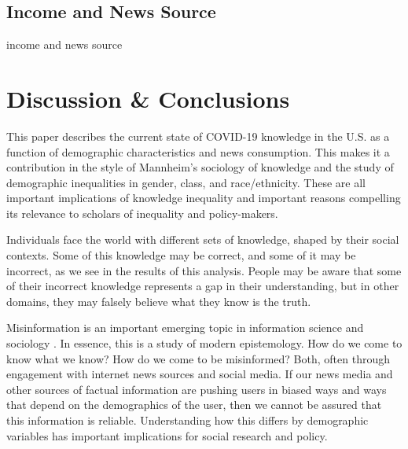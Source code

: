 \documentclass[11pt]{article}
\begin{document}


\hypertarget{income-news}{%
\subsection{Income and News Source}\label{sec:income-news}}

 income and news source



\hypertarget{conclusion}{%
\section{Discussion \& Conclusions}\label{sec:conclusion}}

This paper describes the current state of COVID-19 knowledge in the U.S. as a
function of demographic characteristics and news consumption. This makes it a
contribution in the style of Mannheim's sociology of knowledge
\citep{Mannheim1929,Swidler1994} and the study of demographic inequalities in
gender, class, and race/ethnicity. These are all important implications of
knowledge inequality and important reasons compelling its relevance to scholars
of inequality and policy-makers.

Individuals face the world with different sets of knowledge, shaped by their
social contexts. Some of this knowledge may be correct, and some of it may be
incorrect, as we see in the results of this analysis. People may be aware that
some of their incorrect knowledge represents a gap in their understanding, but
in other domains, they may falsely believe what they know is the truth.


Misinformation is an important emerging topic in
information science and sociology \citep{Metaxa-Kakavouli2017}. In essence, this
is a study of modern epistemology. How do we come to know what we know? How do
we come to be misinformed? Both, often through engagement with internet news
sources and social media. If our news media and other sources of factual
information are pushing users in biased ways and ways that depend on the
demographics of the user, then we cannot be assured that this information is
reliable. Understanding how this differs by demographic variables has important
implications for social research and policy.
\end{document}
